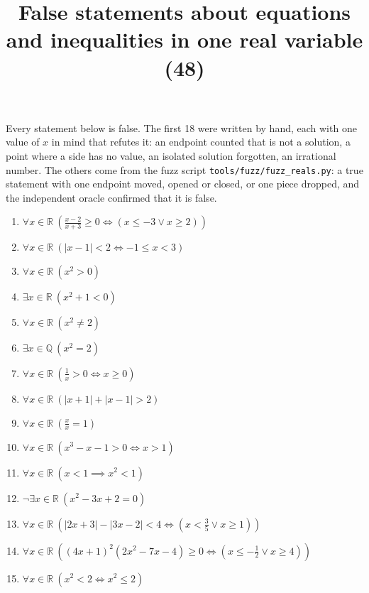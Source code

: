 \documentclass[11pt,a4paper]{article}
\title{False statements about equations and inequalities in one real variable (48)}
\author{}
\date{}
\begin{document}
\maketitle
Every statement below is false. The first 18 were written by hand, each with one value of $x$ in mind that refutes it: an endpoint counted that is not a solution, a point where a side has no value, an isolated solution forgotten, an irrational number. The others come from the fuzz script \texttt{tools/fuzz/fuzz\_reals.py}: a true statement with one endpoint moved, opened or closed, or one piece dropped, and the independent oracle confirmed that it is false.

\begin{enumerate}
\item $\displaystyle \forall x \in \mathbb{R}\ \left(\frac{x - 2}{x + 3} \ge 0 \iff (x \le -3 \lor x \ge 2)\right)$
\item $\displaystyle \forall x \in \mathbb{R}\ \left(\left|x - 1\right| < 2 \iff -1 \le x < 3\right)$
\item $\displaystyle \forall x \in \mathbb{R}\ (x^{2} > 0)$
\item $\displaystyle \exists x \in \mathbb{R}\ (x^{2} + 1 < 0)$
\item $\displaystyle \forall x \in \mathbb{R}\ (x^{2} \neq 2)$
\item $\displaystyle \exists x \in \mathbb{Q}\ (x^{2} = 2)$
\item $\displaystyle \forall x \in \mathbb{R}\ \left(\frac{1}{x} > 0 \iff x \ge 0\right)$
\item $\displaystyle \forall x \in \mathbb{R}\ \left(\left|x + 1\right| + \left|x - 1\right| > 2\right)$
\item $\displaystyle \forall x \in \mathbb{R}\ \left(\frac{x}{x} = 1\right)$
\item $\displaystyle \forall x \in \mathbb{R}\ (x^{3} - x - 1 > 0 \iff x > 1)$
\item $\displaystyle \forall x \in \mathbb{R}\ (x < 1 \implies x^{2} < 1)$
\item $\displaystyle \lnot \exists x \in \mathbb{R}\ (x^{2} - 3x + 2 = 0)$
\item $\displaystyle \forall x \in \mathbb{R}\ \left(\left|2x + 3\right| - \left|3x - 2\right| < 4 \iff (x < \frac{3}{5} \lor x \ge 1)\right)$
\item $\displaystyle \forall x \in \mathbb{R}\ \left((4x + 1)^{2}(2x^{2} - 7x - 4) \ge 0 \iff (x \le -\frac{1}{2} \lor x \ge 4)\right)$
\item $\displaystyle \forall x \in \mathbb{R}\ (x^{2} < 2 \iff x^{2} \le 2)$

\end{enumerate}
\end{document}
